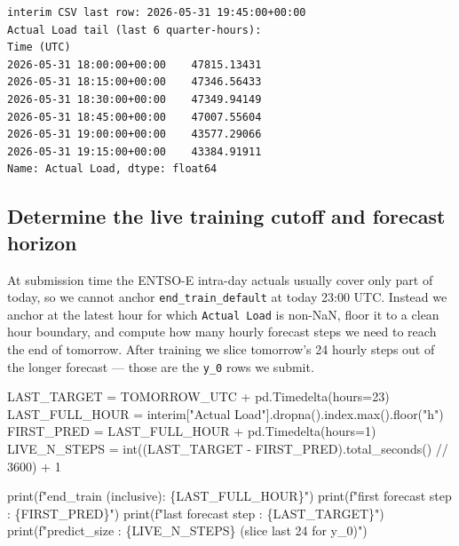 \documentclass[
  english,
  letterpaper,
]{scrbook}
\newenvironment{Shaded}{\begin{snugshade}}{\end{snugshade}}
\newcommand{\BuiltInTok}[1]{\textcolor[rgb]{0.00,0.23,0.31}{#1}}
\newcommand{\DecValTok}[1]{\textcolor[rgb]{0.68,0.00,0.00}{#1}}
\newcommand{\NormalTok}[1]{\textcolor[rgb]{0.00,0.23,0.31}{#1}}
\newcommand{\OperatorTok}[1]{\textcolor[rgb]{0.37,0.37,0.37}{#1}}
\newcommand{\SpecialCharTok}[1]{\textcolor[rgb]{0.37,0.37,0.37}{#1}}
\newcommand{\SpecialStringTok}[1]{\textcolor[rgb]{0.13,0.47,0.30}{#1}}
\newcommand{\StringTok}[1]{\textcolor[rgb]{0.13,0.47,0.30}{#1}}
\begin{document}
\begin{verbatim}
interim CSV last row: 2026-05-31 19:45:00+00:00
Actual Load tail (last 6 quarter-hours):
Time (UTC)
2026-05-31 18:00:00+00:00    47815.13431
2026-05-31 18:15:00+00:00    47346.56433
2026-05-31 18:30:00+00:00    47349.94149
2026-05-31 18:45:00+00:00    47007.55604
2026-05-31 19:00:00+00:00    43577.29066
2026-05-31 19:15:00+00:00    43384.91911
Name: Actual Load, dtype: float64
\end{verbatim}

\subsection{Determine the live training cutoff and forecast
horizon}\label{determine-the-live-training-cutoff-and-forecast-horizon}

At submission time the ENTSO-E intra-day actuals usually cover only part
of today, so we cannot anchor \texttt{end\_train\_default} at today
23:00 UTC. Instead we anchor at the latest hour for which
\texttt{Actual\ Load} is non-NaN, floor it to a clean hour boundary, and
compute how many hourly forecast steps we need to reach the end of
tomorrow. After training we slice tomorrow's 24 hourly steps out of the
longer forecast --- those are the \texttt{y\_0} rows we submit.

\protect{}\label{live-cutoff}
\begin{Shaded}
\begin{Highlighting}[]
\NormalTok{LAST\_TARGET }\OperatorTok{=}\NormalTok{ TOMORROW\_UTC }\OperatorTok{+}\NormalTok{ pd.Timedelta(hours}\OperatorTok{=}\DecValTok{23}\NormalTok{)}
\NormalTok{LAST\_FULL\_HOUR }\OperatorTok{=}\NormalTok{ interim[}\StringTok{"Actual Load"}\NormalTok{].dropna().index.}\BuiltInTok{max}\NormalTok{().floor(}\StringTok{"h"}\NormalTok{)}
\NormalTok{FIRST\_PRED }\OperatorTok{=}\NormalTok{ LAST\_FULL\_HOUR }\OperatorTok{+}\NormalTok{ pd.Timedelta(hours}\OperatorTok{=}\DecValTok{1}\NormalTok{)}
\NormalTok{LIVE\_N\_STEPS }\OperatorTok{=} \BuiltInTok{int}\NormalTok{((LAST\_TARGET }\OperatorTok{{-}}\NormalTok{ FIRST\_PRED).total\_seconds() }\OperatorTok{//} \DecValTok{3600}\NormalTok{) }\OperatorTok{+} \DecValTok{1}

\BuiltInTok{print}\NormalTok{(}\SpecialStringTok{f"end\_train (inclusive): }\SpecialCharTok{\{}\NormalTok{LAST\_FULL\_HOUR}\SpecialCharTok{\}}\SpecialStringTok{"}\NormalTok{)}
\BuiltInTok{print}\NormalTok{(}\SpecialStringTok{f"first forecast step  : }\SpecialCharTok{\{}\NormalTok{FIRST\_PRED}\SpecialCharTok{\}}\SpecialStringTok{"}\NormalTok{)}
\BuiltInTok{print}\NormalTok{(}\SpecialStringTok{f"last forecast step   : }\SpecialCharTok{\{}\NormalTok{LAST\_TARGET}\SpecialCharTok{\}}\SpecialStringTok{"}\NormalTok{)}
\BuiltInTok{print}\NormalTok{(}\SpecialStringTok{f"predict\_size         : }\SpecialCharTok{\{}\NormalTok{LIVE\_N\_STEPS}\SpecialCharTok{\}}\SpecialStringTok{  (slice last 24 for y\_0)"}\NormalTok{)}
\end{Highlighting}
\end{Shaded}
\end{document}
